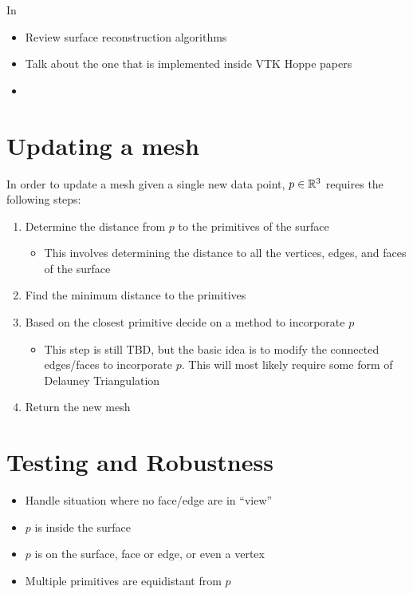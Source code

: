 In 
\begin{itemize}
    \item Review surface reconstruction algorithms
    \item Talk about the one that is implemented inside VTK Hoppe papers
    \item 
\end{itemize}

\section{Updating a mesh}

In order to update a mesh given a single new data point, \( p \in \mathbb{R}^3\) requires the following steps:
\begin{enumerate}
    \item Determine the distance from \( p \) to the primitives of the surface
        \begin{itemize}
            \item This involves determining the distance to all the vertices, edges, and faces of the surface
        \end{itemize}
    \item Find the minimum distance to the primitives
    \item Based on the closest primitive decide on a method to incorporate \( p \)
        \begin{itemize}
            \item This step is still TBD, but the basic idea is to modify the connected edges/faces to incorporate \( p\).
                This will most likely require some form of Delauney Triangulation
        \end{itemize}
    \item Return the new mesh
\end{enumerate}

\section{Testing and Robustness}

\begin{itemize}
    \item Handle situation where no face/edge are in ``view''
    \item \( p \) is inside the surface
    \item \( p \) is on the surface, face or edge, or even a vertex
    \item Multiple primitives are equidistant from \( p \)
\end{itemize}


